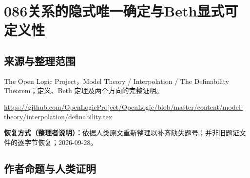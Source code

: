 \documentclass[UTF8,11pt]{ctexart}
\theoremstyle{definition}
\begin{document}
\section*{086\quad 关系的隐式唯一确定与Beth显式可定义性}
\subsection*{来源与整理范围}
The Open Logic Project，Model Theory / Interpolation / The Definability Theorem；定义、Beth 定理及两个方向的完整证明。
\par\url{https://github.com/OpenLogicProject/OpenLogic/blob/master/content/model-theory/interpolation/definability.tex}
\par\textbf{恢复方式（整理者说明）：}依据人类原文重新整理以补齐缺失题号；并非旧题证文件的逐字节恢复；2026-09-28。
\subsection*{作者命题与人类证明}
\end{document}
